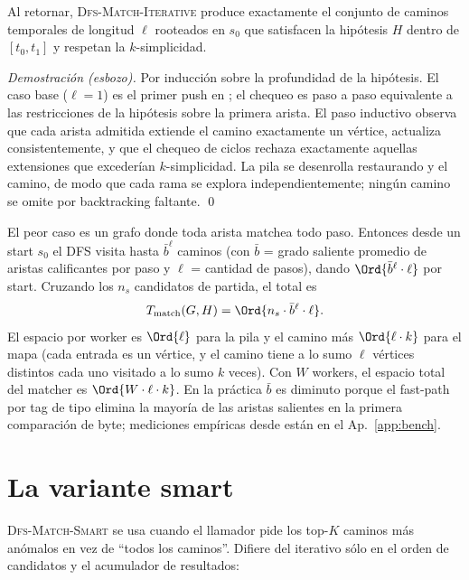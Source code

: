 \begin{theorem}
Al retornar, \textsc{Dfs-Match-Iterative} produce exactamente el
conjunto de caminos temporales de longitud $\ell$ rooteados en
$s_0$ que satisfacen la hipótesis $H$ dentro de $[t_0, t_1]$ y
respetan la $k$-simplicidad.
\end{theorem}

\begin{proof}[Demostración (esbozo)]
Por inducción sobre la profundidad de la hipótesis. El caso base
($\ell = 1$) es el primer push en ; el chequeo es
paso a paso equivalente a las restricciones de la hipótesis sobre
la primera arista. El paso inductivo observa que cada arista
admitida extiende el camino exactamente un vértice, actualiza
 consistentemente, y que el chequeo de ciclos rechaza
exactamente aquellas extensiones que excederían $k$-simplicidad.
La pila se desenrolla restaurando  y el camino, de
modo que cada rama se explora independientemente; ningún camino
se omite por backtracking faltante. \qed
\end{proof}

\begin{complexity}
El peor caso es un grafo donde toda arista matchea todo paso.
Entonces desde un start $s_0$ el DFS visita hasta
$\bar{b}^\ell$ caminos (con $\bar{b}$ = grado saliente promedio
de aristas calificantes por paso y $\ell$ = cantidad de pasos),
dando $\Ord{\bar{b}^\ell \cdot \ell}$ por start. Cruzando los
$n_s$ candidatos de partida, el total es
\[
    T_{\text{match}}(G, H) = \Ord{n_s \cdot \bar{b}^\ell \cdot \ell}.
\]
El espacio por worker es $\Ord{\ell}$ para la pila y el camino más
$\Ord{\ell \cdot k}$ para el mapa  (cada entrada es un
vértice, y el camino tiene a lo sumo $\ell$ vértices distintos cada
uno visitado a lo sumo $k$ veces). Con $W$ workers, el espacio
total del matcher es $\Ord{W \cdot \ell \cdot k}$. En la práctica
$\bar{b}$ es diminuto porque el fast-path por tag de tipo elimina
la mayoría de las aristas salientes en la primera comparación de
byte; mediciones empíricas desde
 están en el Ap.~\ref{app:bench}.
\end{complexity}

\section{La variante smart}

\textsc{Dfs-Match-Smart} se usa cuando el llamador pide los top-$K$
caminos más anómalos en vez de ``todos los caminos''. Difiere del
iterativo sólo en el orden de candidatos y el acumulador de
resultados:

